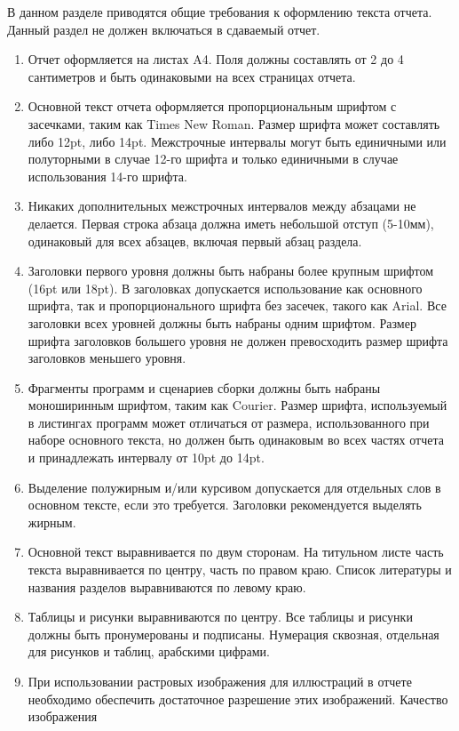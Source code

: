 \documentclass[a4paper,12pt,titlepage,finall]{article}
\begin{document}
В данном разделе приводятся общие требования к оформлению текста отчета.
Данный раздел не должен включаться в сдаваемый отчет.

\begin{enumerate}
\item Отчет оформляется на листах A4. Поля должны составлять от 2 до 4
    сантиметров и быть одинаковыми на всех страницах отчета.
\item Основной текст отчета оформляется пропорциональным шрифтом с засечками,
    таким как Times New Roman. Размер шрифта может составлять либо 12pt, либо 14pt.
    Межстрочные интервалы могут быть единичными или полуторными в случае 12-го шрифта
    и только единичными в случае использования 14-го шрифта.
\item Никаких дополнительных межстрочных интервалов между абзацами не делается.
    Первая строка абзаца должна иметь небольшой отступ (5-10мм), одинаковый для
    всех абзацев, включая первый абзац раздела.
\item Заголовки первого уровня должны быть набраны более крупным шрифтом (16pt или 18pt).
    В заголовках допускается использование как основного шрифта, так и пропорционального
    шрифта без засечек, такого как Arial. Все заголовки всех уровней должны быть набраны
    одним шрифтом. Размер шрифта заголовков большего уровня не должен превосходить размер
    шрифта заголовков меньшего уровня.
\item Фрагменты программ и сценариев сборки должны быть набраны моноширинным шрифтом, таким
    как Courier. Размер шрифта, используемый в листингах программ может отличаться от размера,
    использованного при наборе основного текста, но должен быть одинаковым во всех частях
    отчета и принадлежать интервалу от 10pt до 14pt.
\item Выделение полужирным и/или курсивом допускается для отдельных слов в основном тексте,
    если это требуется. Заголовки рекомендуется выделять жирным.
\item Основной текст выравнивается по двум сторонам. На титульном листе часть текста
    выравнивается по центру, часть по правом краю. Список литературы и названия разделов 
    выравниваются по левому краю.
\item Таблицы и рисунки выравниваются по центру. Все таблицы и рисунки должны быть пронумерованы
    и подписаны. Нумерация сквозная, отдельная для рисунков и таблиц, арабскими цифрами.
\item При использовании растровых изображения для иллюстраций в отчете
    необходимо обеспечить достаточное разрешение этих изображений. Качество изображения

\end{enumerate}
\end{document}
